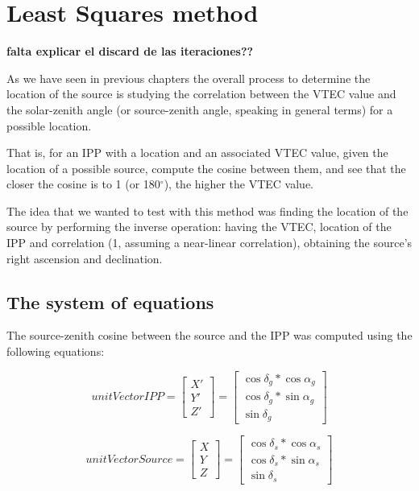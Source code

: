 \chapter{Least Squares method}\label{LSmethodChapter}

\textbf{falta explicar el discard de las iteraciones??}

As we have seen in previous chapters the overall process to determine the location of the source is studying the correlation between the VTEC value and the solar-zenith angle (or source-zenith angle, speaking in general terms) for a possible location.

That is, for an IPP with a location and an associated VTEC value, given the location of a possible source, compute the cosine between them, and see that the closer the cosine is to 1 (or 180$^{\circ}$), the higher the VTEC value.

The idea that we wanted to test with this method was finding the location of the source by performing the inverse operation: having the VTEC, location of the IPP and correlation (1, assuming a near-linear correlation), obtaining the source's right ascension and declination.

\section{The system of equations}

The source-zenith cosine between the source and the IPP was computed using the following equations:

\begin{equation} \label{eq:61}
unitVectorIPP =
\begin{bmatrix}
X' \\
Y' \\
Z'
\end{bmatrix}
=
\begin{bmatrix}
\cos\delta_{g} * \cos\alpha_{g} \\
\cos\delta_{g} * \sin\alpha_{g} \\
\sin\delta_{g}
\end{bmatrix}
\end{equation}

\begin{equation} \label{eq:62}
unitVectorSource =
\begin{bmatrix}
X \\
Y \\
Z
\end{bmatrix}
=
\begin{bmatrix}
\cos\delta_{s} * \cos\alpha_{s} \\
\cos\delta_{s} * \sin\alpha_{s} \\
\sin\delta_{s}
\end{bmatrix}
\end{equation}

